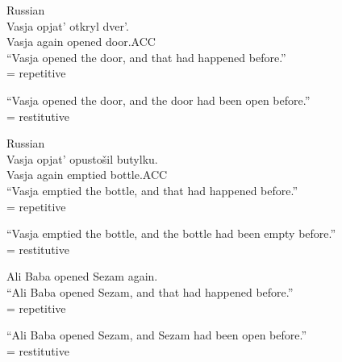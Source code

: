 \documentclass[output=paper,modfonts,nonflat,
 hidelinks
]{langsci/langscibook}
\begin{document}
 \ea\label{ex:bondarenko:}
{Russian}\\

\gll Vasja opjat’ otkryl dver’.\\
     Vasja again opened door.ACC\\
\ea “Vasja opened the door, and that had happened before.”\\
= {repetitive}

\ex “Vasja opened the door, and the door had been open before.”\\
  = {restitutive}
\z
\z

 \ea\label{ex:bondarenko:}
{Russian}\\

\gll Vasja opjat’ opustošil butylku.\\
     Vasja again emptied bottle.ACC\\
\ea “Vasja emptied the bottle, and that had happened before.”\\
= {repetitive}

\ex “Vasja emptied the bottle, and the bottle had been empty   before.”\\
= {restitutive}
\z
\z

 \ea\label{ex:bondarenko:}
{Ali Baba opened Sezam again.}\\

\ea “Ali Baba opened Sezam, and that had happened before.”\\
= {repetitive}

\ex “Ali Baba opened Sezam, and Sezam had been open before.”\\
= {restitutive}
\z
\z
\end{document}
